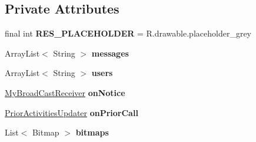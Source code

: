 \subsection*{Private Attributes}
\begin{DoxyCompactItemize}
\item 
final int {\bfseries R\+E\+S\+\_\+\+P\+L\+A\+C\+E\+H\+O\+L\+D\+ER} = R.\+drawable.\+placeholder\+\_\+grey\hypertarget{classcom_1_1example_1_1sebastian_1_1tindertp_1_1MatchingActivity_a3c2438efe2789cf5d8bf6cd61dc1f652}{}\label{classcom_1_1example_1_1sebastian_1_1tindertp_1_1MatchingActivity_a3c2438efe2789cf5d8bf6cd61dc1f652}

\item 
Array\+List$<$ String $>$ {\bfseries messages}\hypertarget{classcom_1_1example_1_1sebastian_1_1tindertp_1_1MatchingActivity_a4463827d3254c49888d8e0169aa98ecf}{}\label{classcom_1_1example_1_1sebastian_1_1tindertp_1_1MatchingActivity_a4463827d3254c49888d8e0169aa98ecf}

\item 
Array\+List$<$ String $>$ {\bfseries users}\hypertarget{classcom_1_1example_1_1sebastian_1_1tindertp_1_1MatchingActivity_aad0824a5e58f07c707649f0a44fe0899}{}\label{classcom_1_1example_1_1sebastian_1_1tindertp_1_1MatchingActivity_aad0824a5e58f07c707649f0a44fe0899}

\item 
\hyperlink{classcom_1_1example_1_1sebastian_1_1tindertp_1_1services_1_1MyBroadCastReceiver}{My\+Broad\+Cast\+Receiver} {\bfseries on\+Notice}\hypertarget{classcom_1_1example_1_1sebastian_1_1tindertp_1_1MatchingActivity_aa3f4089bc985c6c936804905f352e30a}{}\label{classcom_1_1example_1_1sebastian_1_1tindertp_1_1MatchingActivity_aa3f4089bc985c6c936804905f352e30a}

\item 
\hyperlink{classcom_1_1example_1_1sebastian_1_1tindertp_1_1services_1_1PriorActivitiesUpdater}{Prior\+Activities\+Updater} {\bfseries on\+Prior\+Call}\hypertarget{classcom_1_1example_1_1sebastian_1_1tindertp_1_1MatchingActivity_af36e118aa028aee7491a2e22fa273162}{}\label{classcom_1_1example_1_1sebastian_1_1tindertp_1_1MatchingActivity_af36e118aa028aee7491a2e22fa273162}

\item 
List$<$ Bitmap $>$ {\bfseries bitmaps}\hypertarget{classcom_1_1example_1_1sebastian_1_1tindertp_1_1MatchingActivity_a58dc06fa58b2293358e5c034bc2d93c2}{}\label{classcom_1_1example_1_1sebastian_1_1tindertp_1_1MatchingActivity_a58dc06fa58b2293358e5c034bc2d93c2}


\end{DoxyCompactItemize}
